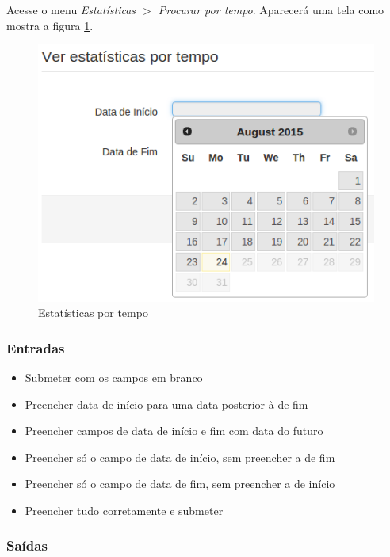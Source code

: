 Acesse o menu \textit{Estatísticas $>$ Procurar por tempo}. Aparecerá uma tela como mostra a figura \ref{fig:estempo}.

\begin{figure}[ht]
     \centering
     \includegraphics[scale=0.5]{images/estatisticatempo.png}
     \caption{Estatísticas por tempo}
     \label{fig:estempo}
\end{figure}

\subsubsection{Entradas}

\begin{itemize}

    \item Submeter com os campos em branco
	\item Preencher data de início para uma data posterior à de fim
	\item Preencher campos de data de início e fim com data do futuro
	\item Preencher só o campo de data de início, sem preencher a de fim
	\item Preencher só o campo de data de fim, sem preencher a de início
	\item Preencher tudo corretamente e submeter
	
\end{itemize}

\subsubsection{Saídas}

